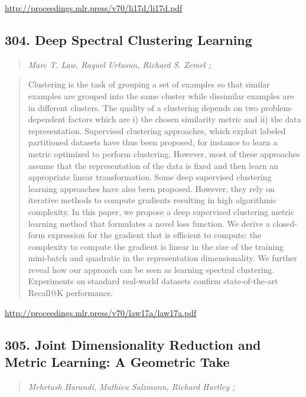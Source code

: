 \documentclass{article}
\begin{document}
\href{http://proceedings.mlr.press/v70/li17d/li17d.pdf}{http://proceedings.mlr.press/v70/li17d/li17d.pdf}

\subsection{304. Deep Spectral Clustering Learning}

\begin{quote}
\footnotesize{\textit{Marc T. Law, Raquel Urtasun, Richard S. Zemel ;}}
\end{quote}

\begin{quote}
    Clustering is the task of grouping a set of examples so that similar examples are grouped into the same cluster while dissimilar examples are in different clusters. The quality of a clustering depends on two problem-dependent factors which are i) the chosen similarity metric and ii) the data representation. Supervised clustering approaches, which exploit labeled partitioned datasets have thus been proposed, for instance to learn a metric optimized to perform clustering. However, most of these approaches assume that the representation of the data is fixed and then learn an appropriate linear transformation. Some deep supervised clustering learning approaches have also been proposed. However, they rely on iterative methods to compute gradients resulting in high algorithmic complexity. In this paper, we propose a deep supervised clustering metric learning method that formulates a novel loss function. We derive a closed-form expression for the gradient that is efficient to compute: the complexity to compute the gradient is linear in the size of the training mini-batch and quadratic in the representation dimensionality. We further reveal how our approach can be seen as learning spectral clustering. Experiments on standard real-world datasets confirm state-of-the-art Recall@K performance.  \end{quote}

\href{http://proceedings.mlr.press/v70/law17a/law17a.pdf}{http://proceedings.mlr.press/v70/law17a/law17a.pdf}

\subsection{305. Joint Dimensionality Reduction and Metric Learning: A Geometric Take}

\begin{quote}
\footnotesize{\textit{Mehrtash Harandi, Mathieu Salzmann, Richard Hartley ;}}
\end{quote}
\end{document}
